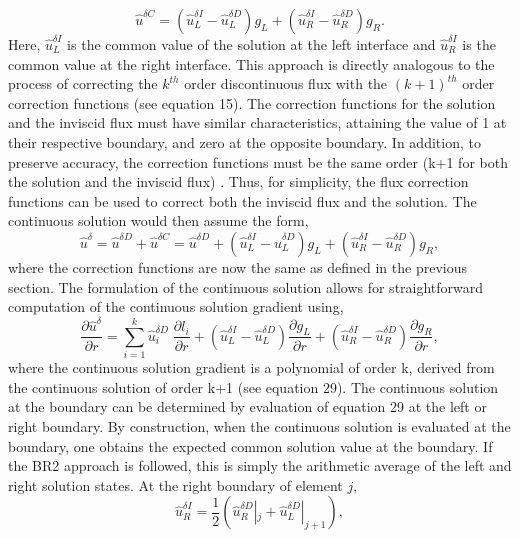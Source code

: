 %
\begin{equation}
\hat{u}^{\delta C}=(\hat{u}^{\delta I}_L-\hat{u}^{\delta D}_L)g_L+(\hat{u}^{\delta I}_R-\hat{u}^{\delta D}_R)g_R.
\end{equation}
%
Here, $\hat{u}^{\delta I}_L$ is the common value of the solution at the left interface and $\hat{u}^{\delta I}_R$ is the common value at the right interface. This approach is directly analogous to the process of correcting the $k^{th}$ order discontinuous flux with the $(k+1)^{th}$ order correction functions (see equation 15). The correction functions for the solution and the inviscid flux must have similar characteristics, attaining the value of 1 at their respective boundary, and zero at the opposite boundary. In addition, to preserve accuracy, the correction functions must be the same order (k+1 for both the solution and the inviscid flux) \cite{Huynh09}. Thus, for simplicity, the flux correction functions can be used to correct both the inviscid flux and the solution. The continuous solution would then assume the form,
%
\begin{equation}
\hat{u}^{\delta}=\hat{u}^{\delta D}+\hat{u}^{\delta C}=\hat{u}^{\delta D}+(\hat{u}^{\delta I}_L-\hat{u}^{\delta D}_L)g_L+(\hat{u}^{\delta I}_R-\hat{u}^{\delta D}_R)g_R,
\end{equation}
%
where the correction functions are now the same as defined in the previous section. The formulation of the continuous solution allows for straightforward computation of the continuous solution gradient using,
%
\begin{equation}
\frac {\partial \hat{u}^{\delta}}{\partial r} = \sum_{i=1}^{k}\hat{u}^{\delta D}_{i}\; \frac{\partial l_i}{\partial r} + (\hat{u}^{\delta I}_L-\hat{u}^{\delta D}_L) \frac {\partial g_L}{\partial r} + (\hat{u}^{\delta I}_R-\hat{u}^{\delta D}_R) \frac {\partial g_R}{\partial r},
\end{equation}
%
where the continuous solution gradient is a polynomial of order k, derived from the continuous solution of order k+1 (see equation 29). The continuous solution at the boundary can be determined by evaluation of equation 29 at the left or right boundary. By construction, when the continuous solution is evaluated at the boundary, one obtains the expected common solution value at the boundary. If the BR2 approach is followed, this is simply the arithmetic average of the left and right solution states. At the right boundary of element $j$,
%
\begin{equation}
\hat{u}^{\delta I}_R =  \frac {1}{2} \left ( \hat{u}^{\delta D}_R |_{j} + \hat{u}^{\delta D}_L |_{j+1}  \right),
\end{equation}
